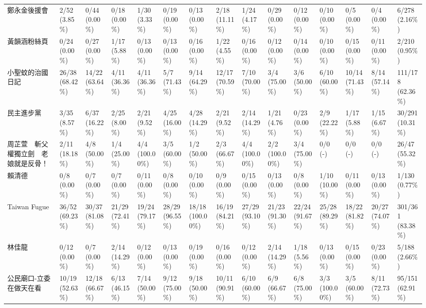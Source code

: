 \documentclass[letterpaper, 10pt, conference]{ieeeconf}   %
\begin{document}
\begin{CJK}{UTF8}{bsmi}
\begin{landscape}
\begin{longtable}[c]{@{}L{2.45cm}L{1.1cm}L{1.1cm}L{1.1cm}L{1.1cm}L{1.1cm}L{1.1cm}L{1.1cm}L{1.1cm}L{1.1cm}L{1.1cm}L{1.1cm}L{1.1cm}L{1.1cm}L{1.1cm}@{}}
鄭永金後援會 & 2/52 (3.85\%) & 0/44 (0.00\%) & 0/18 (0.00\%) & 1/30 (3.33\%) & 0/19 (0.00\%) & 0/13 (0.00\%) & 2/18 (11.11\%) & 1/24 (4.17\%) & 0/29 (0.00\%) & 0/12 (0.00\%) & 0/10 (0.00\%) & 0/5 (0.00\%) & 0/4 (0.00\%) & 6/278 (2.16\%) \\
黃韻涵粉絲頁 & 0/24 (0.00\%) & 0/27 (0.00\%) & 1/17 (5.88\%) & 0/13 (0.00\%) & 0/13 (0.00\%) & 0/16 (0.00\%) & 1/22 (4.55\%) & 0/16 (0.00\%) & 0/12 (0.00\%) & 0/14 (0.00\%) & 0/10 (0.00\%) & 0/15 (0.00\%) & 0/11 (0.00\%) & 2/210 (0.95\%) \\
小聖蚊的治國日記 & 26/38 (68.42\%) & 14/22 (63.64\%) & 4/11 (36.36\%) & 4/11 (36.36\%) & 5/7 (71.43\%) & 9/14 (64.29\%) & 12/17 (70.59\%) & 7/10 (70.00\%) & 3/4 (75.00\%) & 3/6 (50.00\%) & 6/10 (60.00\%) & 10/14 (71.43\%) & 8/14 (57.14\%) & 111/178 (62.36\%) \\
民主進步黨 & 3/35 (8.57\%) & 6/37 (16.22\%) & 2/25 (8.00\%) & 2/21 (9.52\%) & 4/25 (16.00\%) & 4/28 (14.29\%) & 2/21 (9.52\%) & 2/14 (14.29\%) & 1/21 (4.76\%) & 0/23 (0.00\%) & 2/9 (22.22\%) & 1/17 (5.88\%) & 1/15 (6.67\%) & 30/291 (10.31\%) \\
周芷萱　斬父權獨立劍　老娘就是反骨！ & 2/11 (18.18\%) & 4/8 (50.00\%) & 1/4 (25.00\%) & 4/4 (100.00\%) & 3/5 (60.00\%) & 1/2 (50.00\%) & 2/3 (66.67\%) & 4/4 (100.00\%) & 2/2 (100.00\%) & 3/4 (75.00\%) & 0/0 (-) & 0/0 (-) & 0/0 (-) & 26/47 (55.32\%) \\
賴清德 & 0/8 (0.00\%) & 0/7 (0.00\%) & 0/7 (0.00\%) & 0/11 (0.00\%) & 0/8 (0.00\%) & 0/10 (0.00\%) & 0/9 (0.00\%) & 0/15 (0.00\%) & 0/13 (0.00\%) & 0/8 (0.00\%) & 1/10 (10.00\%) & 0/11 (0.00\%) & 0/13 (0.00\%) & 1/130 (0.77\%) \\
Taiwan Fugue & 36/52 (69.23\%) & 30/37 (81.08\%) & 21/29 (72.41\%) & 19/24 (79.17\%) & 28/29 (96.55\%) & 18/18 (100.00\%) & 16/19 (84.21\%) & 27/29 (93.10\%) & 21/23 (91.30\%) & 22/24 (91.67\%) & 25/28 (89.29\%) & 18/22 (81.82\%) & 20/27 (74.07\%) & 301/361 (83.38\%) \\
林佳龍 & 0/12 (0.00\%) & 0/7 (0.00\%) & 2/14 (14.29\%) & 0/12 (0.00\%) & 0/13 (0.00\%) & 0/19 (0.00\%) & 0/16 (0.00\%) & 0/12 (0.00\%) & 2/14 (14.29\%) & 1/18 (5.56\%) & 0/13 (0.00\%) & 0/15 (0.00\%) & 0/23 (0.00\%) & 5/188 (2.66\%) \\
公民廟口-立委在做天在看 & 10/19 (52.63\%) & 12/18 (66.67\%) & 6/13 (46.15\%) & 7/14 (50.00\%) & 9/12 (75.00\%) & 9/18 (50.00\%) & 10/11 (90.91\%) & 6/10 (60.00\%) & 6/9 (66.67\%) & 6/8 (75.00\%) & 3/3 (100.00\%) & 3/5 (60.00\%) & 8/11 (72.73\%) & 95/151 (62.91\%) \\

\end{longtable}
\end{landscape}
\end{CJK}
\end{document}
